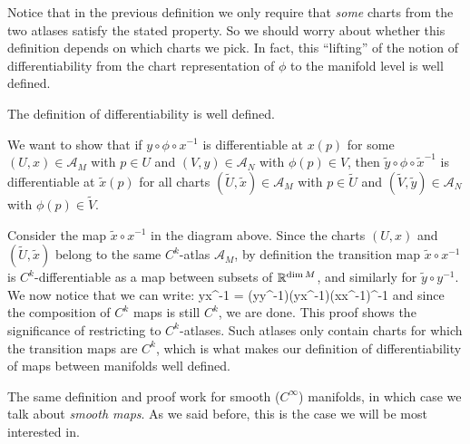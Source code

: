 Notice that in the previous definition we only require that \emph{some} charts from the two atlases satisfy the stated property. So we should worry about whether this definition depends on which charts we pick. In fact, this ``lifting'' of the notion of differentiability from the chart representation of $\phi$ to the manifold level is well defined.

\bp
The definition of differentiability is well defined.
\ep

\bq
We want to show that if $y\circ\phi\circ x^{-1}$ is differentiable at $x(p)$ for some $(U,x)\in\mathscr{A}_M$ with $p\in U$ and $(V,y)\in\mathscr{A}_N$ with $\phi(p)\in V$, then $\widetilde y\circ\phi\circ \widetilde x^{-1}$ is differentiable at $\widetilde x(p)$ for all charts $(\widetilde U,\widetilde x)\in\mathscr{A}_M$ with $p\in \widetilde U$ and $(\widetilde V,\widetilde y)\in\mathscr{A}_N$ with $\phi(p)\in \widetilde V$.
\bse
{}
\ese
Consider the map $\widetilde x\circ x^{-1}$ in the diagram above. Since the charts $(U,x)$ and $(\widetilde U,\widetilde x)$ belong to the same $C^k$-atlas $\mathscr{A}_M$, by definition the transition map $\widetilde x\circ x^{-1}$ is $C^k$-differentiable as a map between subsets of $\mathbb{R}^{\dim M}$, and similarly for $\widetilde y\circ y^{-1}$. We now notice that we can write:
\bse
\widetilde y\circ\phi\circ \widetilde x^{-1} = (\widetilde y\circ y^{-1})\circ(y\circ\phi\circ x^{-1})\circ(\widetilde x\circ x^{-1})^{-1}
\ese
and since the composition of $C^k$ maps is still $C^k$, we are done.
\eq
This proof shows the significance of restricting to $C^k$-atlases. Such atlases only contain charts for which the transition maps are $C^k$, which is what makes our definition of differentiability of maps between manifolds well defined.

The same definition and proof work for smooth ($C^\infty$) manifolds, in which case we talk about \emph{smooth maps}. As we said before, this is the case we will be most interested in.

